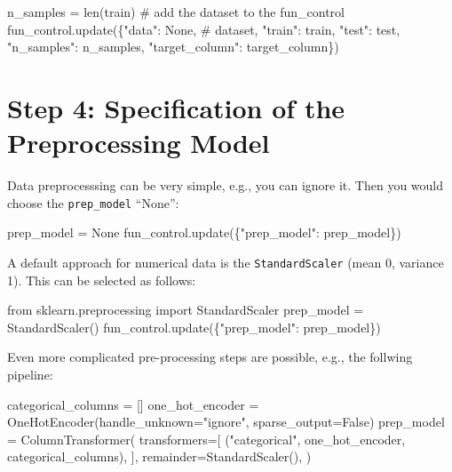 \documentclass[
  letterpaper,
  DIV=11,
  numbers=noendperiod]{scrreprt}
\newenvironment{Shaded}{\begin{snugshade}}{\end{snugshade}}
\newcommand{\BuiltInTok}[1]{\textcolor[rgb]{0.00,0.23,0.31}{#1}}
\newcommand{\CommentTok}[1]{\textcolor[rgb]{0.37,0.37,0.37}{#1}}
\newcommand{\ImportTok}[1]{\textcolor[rgb]{0.00,0.46,0.62}{#1}}
\newcommand{\NormalTok}[1]{\textcolor[rgb]{0.00,0.23,0.31}{#1}}
\newcommand{\OperatorTok}[1]{\textcolor[rgb]{0.37,0.37,0.37}{#1}}
\newcommand{\StringTok}[1]{\textcolor[rgb]{0.13,0.47,0.30}{#1}}
\newcommand{\VariableTok}[1]{\textcolor[rgb]{0.07,0.07,0.07}{#1}}
\begin{document}
\begin{Shaded}
\begin{Highlighting}[]
\NormalTok{n\_samples }\OperatorTok{=} \BuiltInTok{len}\NormalTok{(train)}
\CommentTok{\# add the dataset to the fun\_control}
\NormalTok{fun\_control.update(\{}\StringTok{"data"}\NormalTok{: }\VariableTok{None}\NormalTok{, }\CommentTok{\# dataset,}
               \StringTok{"train"}\NormalTok{: train,}
               \StringTok{"test"}\NormalTok{: test,}
               \StringTok{"n\_samples"}\NormalTok{: n\_samples,}
               \StringTok{"target\_column"}\NormalTok{: target\_column\})}
\end{Highlighting}
\end{Shaded}

\hypertarget{sec-specification-of-preprocessing-model-10}{%
\section{Step 4: Specification of the Preprocessing
Model}\label{sec-specification-of-preprocessing-model-10}}

Data preprocesssing can be very simple, e.g., you can ignore it. Then
you would choose the \texttt{prep\_model} ``None'':

\begin{Shaded}
\begin{Highlighting}[]
\NormalTok{prep\_model }\OperatorTok{=} \VariableTok{None}
\NormalTok{fun\_control.update(\{}\StringTok{"prep\_model"}\NormalTok{: prep\_model\})}
\end{Highlighting}
\end{Shaded}

A default approach for numerical data is the \texttt{StandardScaler}
(mean 0, variance 1). This can be selected as follows:

\begin{Shaded}
\begin{Highlighting}[]
\ImportTok{from}\NormalTok{ sklearn.preprocessing }\ImportTok{import}\NormalTok{ StandardScaler}
\NormalTok{prep\_model }\OperatorTok{=}\NormalTok{ StandardScaler()}
\NormalTok{fun\_control.update(\{}\StringTok{"prep\_model"}\NormalTok{: prep\_model\})}
\end{Highlighting}
\end{Shaded}

Even more complicated pre-processing steps are possible, e.g., the
follwing pipeline:

\begin{Shaded}
\begin{Highlighting}[]
\NormalTok{categorical\_columns = []}
\NormalTok{one\_hot\_encoder = OneHotEncoder(handle\_unknown="ignore", sparse\_output=False)}
\NormalTok{prep\_model = ColumnTransformer(}
\NormalTok{         transformers=[}
\NormalTok{             ("categorical", one\_hot\_encoder, categorical\_columns),}
\NormalTok{         ],}
\NormalTok{         remainder=StandardScaler(),}
\NormalTok{     )}
\end{Highlighting}
\end{Shaded}
\end{document}
